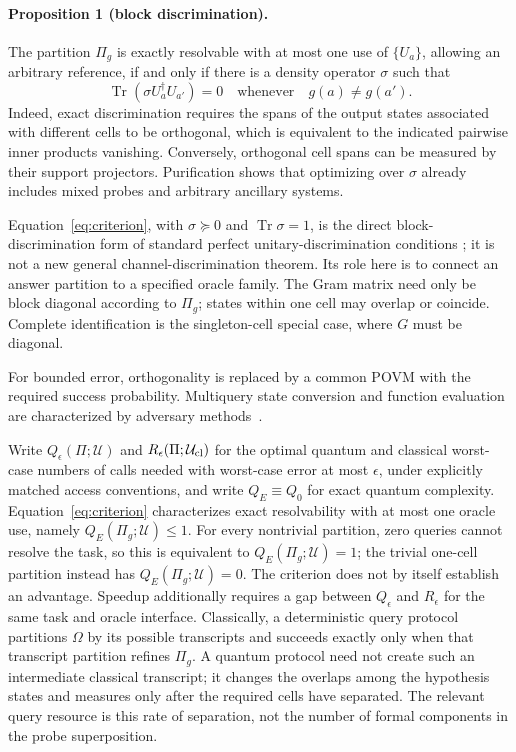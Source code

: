 \documentclass[
  aps,
  prl,
  reprint,
  nofootinbib
]{revtex4-2}
\begin{document}
\paragraph{Proposition 1 (block discrimination).}
The partition \(\Pi_g\) is exactly resolvable with at most one use of
\(\{U_a\}\), allowing an arbitrary reference, if and only if there is a
density operator \(\sigma\) such that
\begin{equation}
 \operatorname{Tr}\!\left(\sigma U_a^\dagger U_{a'}\right)=0
 \quad\text{whenever}\quad g(a)\ne g(a').
 \label{eq:criterion}
\end{equation}
Indeed, exact discrimination requires the spans of the output states
associated with different cells to be orthogonal, which is equivalent to the
indicated pairwise inner products vanishing. Conversely, orthogonal cell
spans can be measured by their support projectors. Purification shows that
optimizing over \(\sigma\) already includes mixed probes and arbitrary
ancillary systems.

Equation~\eqref{eq:criterion}, with \(\sigma\succeq0\) and
\(\operatorname{Tr}\sigma=1\), is the direct block-discrimination form of
standard perfect unitary-discrimination conditions
\cite{Acin2001UnitaryDiscrimination,DuanFengYing2009}; it is not a new general
channel-discrimination theorem. Its role here is to connect an answer
partition to a specified oracle family. The Gram matrix need only be block
diagonal according to \(\Pi_g\); states within one cell may overlap or
coincide. Complete identification is the singleton-cell special case, where
\(G\) must be diagonal.

For bounded error, orthogonality is replaced by a common POVM with the required
success probability. Multiquery state conversion and function evaluation are
characterized by adversary methods~\cite{LeeEtAl2011StateConversion,
Reichardt2014SpanPrograms}.

Write \(Q_\epsilon(\Pi;\mathcal U)\) and
\(R_\epsilon(\Pi;\mathcal U_{\rm cl})\) for the optimal quantum and
classical worst-case numbers of calls needed with worst-case error at most
\(\epsilon\), under explicitly matched access conventions, and write
\(Q_E\equiv Q_0\) for exact quantum complexity.
Equation~\eqref{eq:criterion} characterizes exact resolvability with at most
one oracle use, namely \(Q_E(\Pi_g;\mathcal U)\le1\). For every nontrivial
partition, zero queries cannot resolve the task, so this is equivalent to
\(Q_E(\Pi_g;\mathcal U)=1\); the trivial one-cell partition instead has
\(Q_E(\Pi_g;\mathcal U)=0\). The criterion does not by itself establish an
advantage. Speedup additionally requires a gap between
\(Q_\epsilon\) and \(R_\epsilon\) for the same task and oracle interface.
Classically, a deterministic query protocol partitions \(\Omega\) by its
possible transcripts and succeeds exactly only when that transcript
partition refines \(\Pi_g\). A quantum protocol need not create such an
intermediate classical transcript; it changes the overlaps among the
hypothesis states and measures only after the required cells have separated.
The relevant query resource is this rate of separation, not the number of
formal components in the probe superposition.
\end{document}

